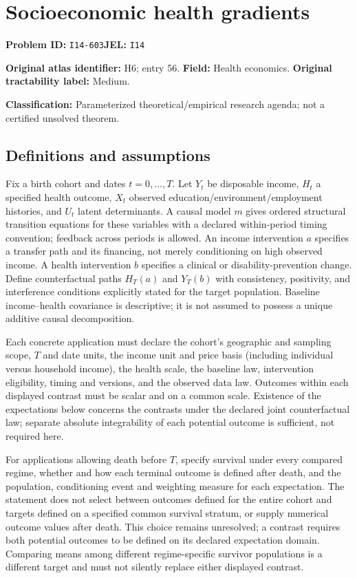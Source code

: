 \documentclass[11pt,a4paper]{article}
\begin{document}
\section*{Socioeconomic health gradients}
\textbf{Problem ID:} \texttt{I14-603}\quad \textbf{JEL:} \texttt{I14}\par
\label{problem:OP-0056}
\label{atlas:prob:H6}
\noindent\textbf{Original atlas identifier:} H6; entry 56. \textbf{Field:} Health economics. \textbf{Original tractability label:} Medium.

\noindent\textbf{Classification:} Parameterized theoretical/empirical research agenda; not a certified unsolved theorem.

\subsection*{Definitions and assumptions}
Fix a birth cohort and dates $t=0,\ldots,T$. Let $Y_t$ be disposable income, $H_t$ a specified health outcome, $X_t$ observed education/environment/employment histories, and $U_t$ latent determinants. A causal model $m$ gives ordered structural transition equations for these variables with a declared within-period timing convention; feedback across periods is allowed. An income intervention $a$ specifies a transfer path and its financing, not merely conditioning on high observed income. A health intervention $b$ specifies a clinical or disability-prevention change. Define counterfactual paths $H_T(a)$ and $Y_T(b)$ with consistency, positivity, and interference conditions explicitly stated for the target population. Baseline income--health covariance is descriptive; it is not assumed to possess a unique additive causal decomposition.

Each concrete application must declare the cohort's geographic and sampling scope, $T$ and date units, the income unit and price basis (including individual versus household income), the health scale, the baseline law, intervention eligibility, timing and versions, and the observed data law. Outcomes within each displayed contrast must be scalar and on a common scale. Existence of the expectations below concerns the contrasts under the declared joint counterfactual law; separate absolute integrability of each potential outcome is sufficient, not required here.

For applications allowing death before $T$, specify survival under every compared regime, whether and how each terminal outcome is defined after death, and the population, conditioning event and weighting measure for each expectation. The statement does not select between outcomes defined for the entire cohort and targets defined on a specified common survival stratum, or supply numerical outcome values after death. This choice remains unresolved; a contrast requires both potential outcomes to be defined on its declared expectation domain. Comparing means among different regime-specific survivor populations is a different target and must not silently replace either displayed contrast.
\end{document}
